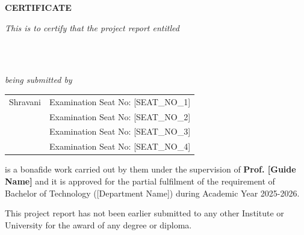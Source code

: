 \begin{center}
\vspace*{3\baselineskip}
{\Large \bf{CERTIFICATE}} \\
\end{center}

\vspace{0.4cm}
\centerline{\textit{This is to certify that the project report entitled}}
\vspace*{0.6\baselineskip}

{\bfseries \fontsize{16}{12} \centering\selectfont{SYNAPSE}  \\}
\vspace*{0.3\baselineskip}
{\bfseries \fontsize{14}{12} \centering\selectfont{AI-Powered AIOps Platform for Automated Root Cause Analysis of Microservice Failures}  \\}
\vspace*{0.6\baselineskip}

\centerline{\textit{being submitted by}}
\vspace*{0.5\baselineskip}

{\large \begin{center}
\begin{tabular}{l l}
Shravani         & Examination Seat No: [SEAT\_NO\_1]  \\
[Teammate 2]     & Examination Seat No: [SEAT\_NO\_2]  \\
[Teammate 3]     & Examination Seat No: [SEAT\_NO\_3]  \\
[Teammate 4]     & Examination Seat No: [SEAT\_NO\_4]  \\
\end{tabular}
\end{center}}

\vspace*{1.5\baselineskip}
\noindent is a bonafide work carried out by them under the supervision of \textbf{Prof. [Guide Name]} and it is approved for the partial fulfilment of the requirement of Bachelor of Technology ([Department Name]) during Academic Year 2025-2026.

\vspace*{0.8\baselineskip}
\noindent This project report has not been earlier submitted to any other Institute or University for the award of any degree or diploma.

\vspace*{3.5\baselineskip}

